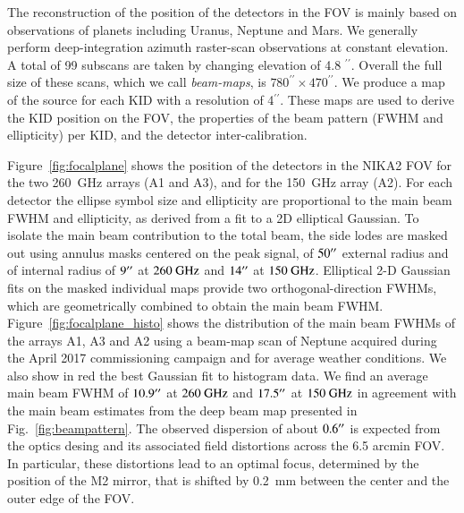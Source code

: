 \documentclass[]{aa} %
\begin{document}
The reconstruction of the position of the detectors in the FOV is mainly based on observations of planets including Uranus, Neptune and Mars. We generally perform deep-integration azimuth raster-scan observations at constant elevation. A total of 99 subscans are taken by changing elevation of 4.8 $^{\prime \prime}$. Overall the full size of these scans, which we call {\it beam-maps}, is $780^{\prime \prime} \times 470^{\prime \prime}$. We produce a map of the source for each KID with a resolution of 4$^{\prime \prime}$. These maps are used to derive the KID position on the FOV, the properties of the beam pattern (FWHM and ellipticity) per KID, and the detector inter-calibration. 

Figure~\ref{fig:focalplane} shows the position of the detectors in the NIKA2 FOV for the two 260~GHz arrays (A1 and A3), and for the 150~GHz array (A2). For each detector the ellipse symbol size and ellipticity are proportional to the main beam FWHM and ellipticity, as derived from a fit to a 2D elliptical Gaussian. To isolate the main beam contribution to the total beam, the
side lodes are masked out using annulus masks centered on the peak signal, of $50\hbox{$^{\prime\prime}$}$ external radius and of internal radius of $9\hbox{$^{\prime\prime}$}$ at $260~\rm{GHz}$ and $14\hbox{$^{\prime\prime}$}$ at $150~\rm{GHz}$. Elliptical 2-D Gaussian fits on the masked individual maps provide two orthogonal-direction FWHMs, which are geometrically
combined to obtain the main beam FWHM. Figure~\ref{fig:focalplane_histo} shows the distribution of the main
beam FWHMs of the arrays A1, A3 and A2 using a beam-map scan of Neptune acquired during the April 2017 commissioning campaign and for average weather conditions. We also show in red the best Gaussian fit to histogram data. We find an average main beam FWHM of $10.9\hbox{$^{\prime\prime}$}$ at $260~\rm{GHz}$ and $17.5\hbox{$^{\prime\prime}$}$ at $150~\rm{GHz}$ in agreement with the main beam estimates from the deep beam map presented in Fig.~\ref{fig:beampattern}. The observed dispersion of about $0.6\hbox{$^{\prime\prime}$}$ is expected from the optics desing and its associated field distortions across the 6.5 arcmin FOV. In particular, these distortions lead to an optimal focus,
determined by the position of the M2 mirror, that is shifted by 0.2~\rm{mm} between the center and the outer edge of the FOV.
 
\end{document}
